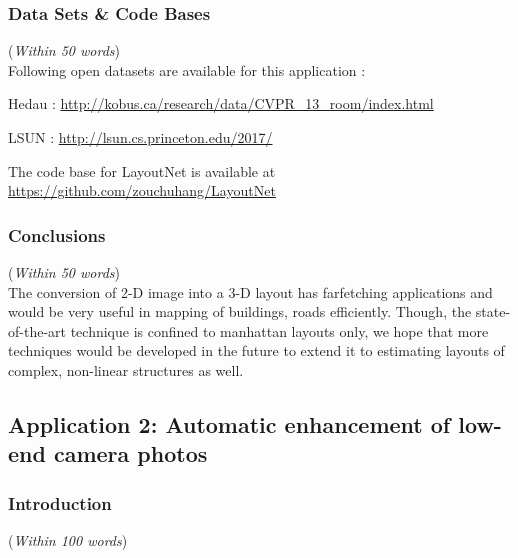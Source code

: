 \documentclass[11pt]{article}
\begin{document}
\subsubsection{Data Sets \& Code Bases}
({\em Within 50 words}) \\

Following open datasets are available for this application :

Hedau : \url{http://kobus.ca/research/data/CVPR\_13\_room/index.html}

LSUN : \url{http://lsun.cs.princeton.edu/2017/}

The code base for LayoutNet is available at 
\url{https://github.com/zouchuhang/LayoutNet}


\subsubsection{Conclusions}
({\em Within 50 words}) \\

The conversion of 2-D image into a 3-D layout has farfetching applications and would be very useful in mapping of buildings, roads efficiently. Though, the state-of-the-art technique is confined to manhattan layouts only, we hope that more techniques would be developed in the future to extend it to estimating layouts of complex, non-linear structures as well.

\newpage
\subsection{Application 2: Automatic enhancement of low-end camera photos}
\subsubsection{Introduction} 
({\em Within 100 words}) \\
\end{document}
